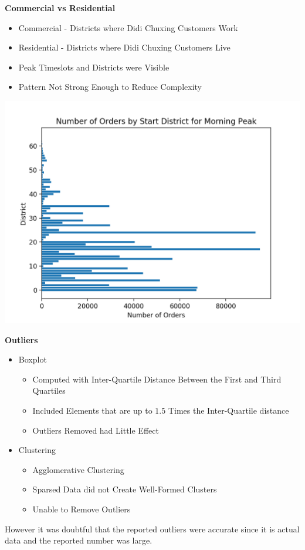 \documentclass[landscape,a0paper,fontscale=0.285]{baposter} %
\newcommand{\compresslist}{ %
\setlength{\itemsep}{1pt}
\setlength{\parskip}{0pt}
\setlength{\parsep}{0pt}
}
\begin{document}
\begin{poster}
{\begin{multicols*}{2}
\textbf{Commercial vs Residential}
\begin{itemize}\compresslist
	\item Commercial - Districts where Didi Chuxing Customers Work
	\item Residential - Districts where Didi Chuxing Customers Live
	\item Peak Timeslots and Districts were Visible
	\item Pattern Not Strong Enough to Reduce Complexity
\end{itemize}
\begin{center}
\includegraphics[width=0.7\linewidth]{figures/StartMorning.png}
\end{center}
\columnbreak
\textbf{Outliers}
\begin{itemize}
	\item Boxplot
	\begin{itemize}\compresslist
		\item Computed with Inter-Quartile Distance Between the First and Third Quartiles
		\item Included Elements that are up to $1.5$ Times the Inter-Quartile distance
		\item Outliers Removed had Little Effect
	\end{itemize}
	\item Clustering
	\begin{itemize}\compresslist
		\item Agglomerative Clustering
		\item Sparsed Data did not Create Well-Formed Clusters
		\item Unable to Remove Outliers
	\end{itemize}
\end{itemize}
 However it was doubtful that the reported outliers were accurate since it is actual data and the reported number was large.\\


\end{multicols*}}
\end{poster}
\end{document}
